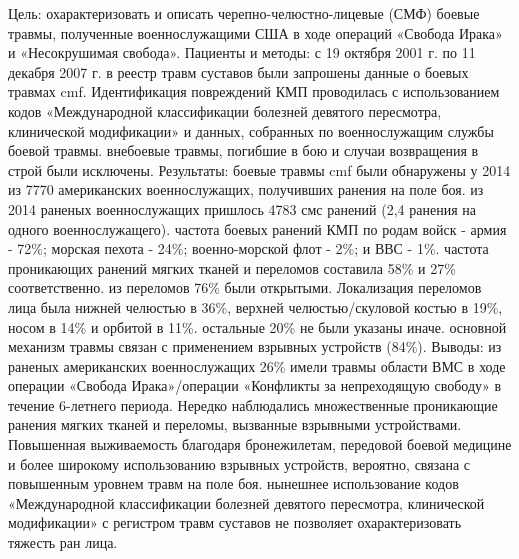 Цель: охарактеризовать и описать черепно-челюстно-лицевые (СМФ) боевые травмы,
полученные военнослужащими США в ходе операций «Свобода Ирака» и «Несокрушимая
свобода». Пациенты и методы: с 19 октября 2001 г. по 11 декабря 2007 г. в реестр
травм суставов были запрошены данные о боевых травмах cmf. Идентификация
повреждений КМП проводилась с использованием кодов «Международной классификации
болезней девятого пересмотра, клинической модификации» и данных, собранных по
военнослужащим службы боевой травмы. внебоевые травмы, погибшие в бою и случаи
возвращения в строй были исключены. Результаты: боевые травмы cmf были
обнаружены у 2014 из 7770 американских военнослужащих, получивших ранения на
поле боя. из 2014 раненых военнослужащих пришлось 4783 смс ранений (2,4 ранения
на одного военнослужащего). частота боевых ранений КМП по родам войск - армия -
72\%; морская пехота - 24\%; военно-морской флот - 2\%; и ВВС - 1\%. частота
проникающих ранений мягких тканей и переломов составила 58\% и 27\%
соответственно. из переломов 76\% были открытыми. Локализация переломов лица была
нижней челюстью в 36\%, верхней челюстью/скуловой костью в 19\%, носом в 14\% и
орбитой в 11\%. остальные 20\% не были указаны иначе. основной механизм травмы
связан с применением взрывных устройств (84\%). Выводы: из раненых американских
военнослужащих 26\% имели травмы области ВМС в ходе операции «Свобода
Ирака»/операции «Конфликты за непреходящую свободу» в течение 6-летнего периода.
Нередко наблюдались множественные проникающие ранения мягких тканей и переломы,
вызванные взрывными устройствами. Повышенная выживаемость благодаря
бронежилетам, передовой боевой медицине и более широкому использованию взрывных
устройств, вероятно, связана с повышенным уровнем травм на поле боя.  нынешнее
использование кодов «Международной классификации болезней девятого пересмотра,
клинической модификации» с регистром травм суставов не позволяет
охарактеризовать тяжесть ран лица.\cite{lew2010}

